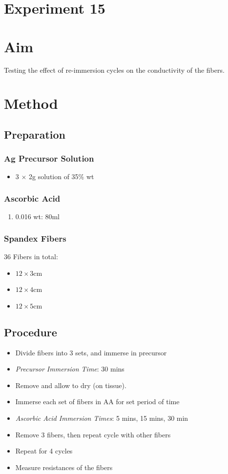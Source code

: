 \documentclass{article}
\begin{document}
\section*{Experiment 15}

\section{Aim}
Testing the effect of re-immersion cycles on the conductivity of the fibers.

\section{Method}
\subsection{Preparation}
\subsubsection{Ag Precursor Solution}
\begin{itemize}
    \item  3 $\times$ 2g solution of  35\% wt
\end{itemize}

\subsubsection{Ascorbic Acid}
\begin{enumerate}
    \item 0.016 wt: 80ml
\end{enumerate}

\subsubsection{Spandex Fibers}
36 Fibers in total:
\begin{itemize}
    \item $12\times 3$cm
    \item $12\times 4$cm
    \item $12\times 5$cm
\end{itemize}

\subsection{Procedure}
\begin{itemize}
    \item Divide fibers into 3 sets, and immerse in precursor
    \item \textit{Precursor Immersion Time}: 30 mins
    \item Remove and allow to dry (on tissue).
    \item Immerse each set of fibers in AA for set period of time
    \item \textit{Ascorbic Acid Immersion Times}: 5 mins, 15 mins, 30 min
    \item Remove 3 fibers, then repeat cycle with other fibers 
    \item Repeat for 4 cycles
    \item Measure resistances of the fibers
\end{itemize}
\end{document}
